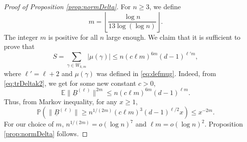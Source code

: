 \documentclass[11pt]{article}
\newcommand{\dE}{\mathbb {E}}
\newcommand{\dP}{\mathbb{P}}
\newcommand{\PAR}[1]{{{\left(#1\right)}}} %
\newcommand{\uB}{{\underline B}}
\newcommand{\1}{1\!\!{\sf I}}\newcommand{\IND}{\1}
\begin{document}
\begin{proof}[Proof of Proposition \ref{prop:normDelta}]
For $n \geq 3$, we define 
\begin{equation}\label{eq:choicem}
m = \left\lfloor  \frac{ \log n }{13 \log (\log n)} \right\rfloor.
\end{equation}
The integer $m$ is positive for all $n$ large enough.  We claim that it is sufficient to prove that 
\begin{equation}\label{eq:boundS}
S = \sum_{\gamma \in W_{k,m} }   | \mu(\gamma) | \leq n  (c \ell  m )^{6 m} (d-1)^{\ell' m},
\end{equation}
where $\ell' = \ell+2$ and $\mu(\gamma)$ was defined in \eqref{eq:defmug}. Indeed, from \eqref{eq:trDeltak2}, we get for some new constant $c >0$, 
$$
\dE \|\uB^{(\ell)}  \| ^{2 m} \leq n  (c \ell  m )^{6 m} (d-1)^{\ell m}.
$$
Thus, from Markov inequality, for any $x \geq 1$,
\begin{equation}\label{eq:Markov}
\dP \PAR{ \|\uB^{(\ell)}  \| \geq n^{1/(2m)} (c \ell m) ^3 (d-1)^{\ell/2} x} \leq x^ {-2m}.
\end{equation}
For our choice of $m$, $n ^{  1 / (2m) } = o ( \log n )^{7}$ and $\ell m = o ( \log n) ^2$. Proposition \ref{prop:normDelta} follows. 




\end{proof}
\end{document}
